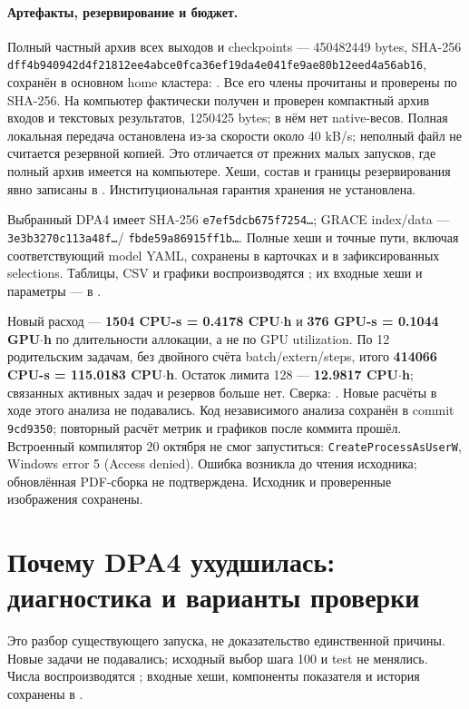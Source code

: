 \documentclass[11pt,a4paper]{article}
\begin{document}
\paragraph{Артефакты, резервирование и бюджет.}
Полный частный архив всех выходов и checkpoints ---
450482449 bytes, SHA-256
\texttt{dff4b940942d4f21\allowbreak 812ee4abce0fca36\allowbreak ef19da4e041fe9ae\allowbreak 80b12eed4a56ab16},
сохранён в основном home кластера:
.
Все его члены прочитаны и проверены по SHA-256.
На компьютер фактически получен и проверен компактный архив входов
и текстовых результатов, 1250425 bytes; в нём нет native-весов.
Полная локальная передача остановлена из-за скорости около 40 kB/s;
неполный файл не считается резервной копией. Это отличается от прежних
малых запусков, где полный архив имеется на компьютере.
Хеши, состав и границы резервирования явно записаны в
.
Институциональная гарантия хранения не установлена.

Выбранный DPA4 имеет SHA-256 \texttt{e7ef5dcb675f7254\ldots};
GRACE index/data --- \texttt{3e3b3270c113a48f\ldots}/
\texttt{fbde59a86915ff1b\ldots}. Полные хеши и точные пути,
включая соответствующий model YAML, сохранены в карточках
 и в зафиксированных selections.
Таблицы, CSV и графики воспроизводятся ;
их входные хеши и параметры --- в
.

Новый расход --- \textbf{1504 CPU-s = 0.4178 CPU$\cdot$h}
и \textbf{376 GPU-s = 0.1044 GPU$\cdot$h} по длительности
аллокации, а не по GPU utilization.
По 12 родительским задачам, без двойного счёта batch/extern/steps,
итого \textbf{414066 CPU-s = 115.0183 CPU$\cdot$h}.
Остаток лимита 128 --- \textbf{12.9817 CPU$\cdot$h};
связанных активных задач и резервов больше нет. Сверка:
.
Новые расчёты в ходе этого анализа не подавались.
Код независимого анализа сохранён в commit \texttt{9cd9350};
повторный расчёт метрик и графиков после коммита прошёл.
Встроенный компилятор 20 октября не смог запуститься:
\texttt{CreateProcessAsUserW}, Windows error 5 (Access denied).
Ошибка возникла до чтения исходника; обновлённая PDF-сборка
не подтверждена. Исходник и проверенные изображения сохранены.

\section{Почему DPA4 ухудшилась: диагностика и варианты проверки}
\label{sec:dpa4-diagnosis}
Это разбор существующего запуска, не доказательство единственной причины.
Новые задачи не подавались; исходный выбор шага 100 и test не менялись.
Числа воспроизводятся ; входные хеши,
компоненты показателя и история сохранены в
.
\end{document}
